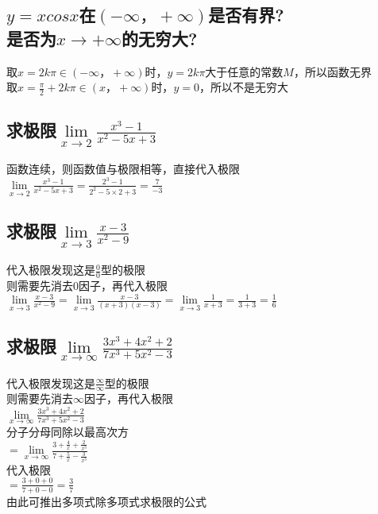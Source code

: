 \documentclass{article}
\begin{document}
\begin{flushleft}
\subsection{
$y=xcosx$在$(-\infty，+\infty)$是否有界?\\
是否为$x\to +\infty$的无穷大?
}
取$x=2k\pi\in(-\infty，+\infty)$时，$y=2k\pi$大于任意的常数$M$，所以函数无界\\
取$x=\frac{\pi}{2}+2k\pi\in(x，+\infty)$时，$y=0$，所以不是无穷大\\

\subsection{
求极限$\lim\limits_{x\to 2}\frac{x^3-1}{x^2-5x+3}$
}
函数连续，则函数值与极限相等，直接代入极限\\
$\lim\limits_{x\to 2}\frac{x^3-1}{x^2-5x+3}=\frac{2^3-1}{2^2-5\times2+3}=\frac{7}{-3}$\\

\subsection{
求极限$\lim\limits_{x\to 3}\frac{x-3}{x^2-9}$
}
代入极限发现这是$\frac{0}{0}$型的极限\\
则需要先消去$0$因子，再代入极限\\
$\lim\limits_{x\to 3}\frac{x-3}{x^2-9}=\lim\limits_{x\to 3}\frac{x-3}{(x+3)(x-3)}=\lim\limits_{x\to 3}\frac{1}{x+3}=\frac{1}{3+3}=\frac{1}{6}$\\

\subsection{
求极限$\lim\limits_{x\to \infty}\frac{3x^3+4x^2+2}{7x^3+5x^2-3}$
}
代入极限发现这是$\frac{\infty}{\infty}$型的极限\\
则需要先消去$\infty$因子，再代入极限\\
$\lim\limits_{x\to \infty}\frac{3x^3+4x^2+2}{7x^3+5x^2-3}$\\
分子分母同除以最高次方\\
$=\lim\limits_{x\to \infty}\frac{3+\frac{4}{x}+\frac{2}{x^3}}{7+\frac{5}{x}-\frac{3}{x^3}}$\\
代入极限\\
$=\frac{3+0+0}{7+0-0}=\frac{3}{7}$\\
由此可推出多项式除多项式求极限的公式\\


\end{flushleft}
\end{document}
